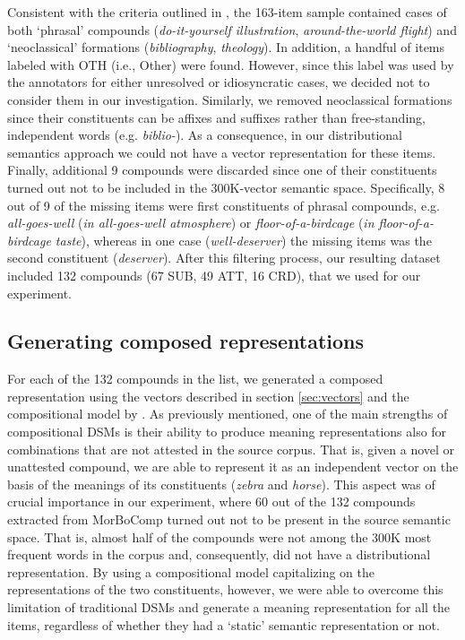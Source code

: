 \documentclass[output=paper]{langsci/langscibook}
\begin{document}
Consistent with the criteria outlined in \cite{SB2005}, the 163-item sample contained cases of both `phrasal' compounds (\emph{do-it-yourself illustration}, \emph{around-the-world flight}) and `neoclassical' formations (\emph{bibliography}, \emph{theology}). In addition, a handful of items labeled with OTH (i.e., Other) were found. However, since this label was used by the annotators for either unresolved or idiosyncratic cases, we decided not to consider them in our investigation. Similarly, we removed neoclassical formations since their constituents can be affixes and suffixes rather than free-standing, independent words (e.g. \emph{biblio-}). As a consequence, in our distributional semantics approach we could not have a vector representation for these items. Finally, additional 9 compounds were discarded since one of their constituents turned out not to be included in the 300K-vector semantic space. Specifically, 8 out of 9 of the missing items were first constituents of phrasal compounds, e.g. \emph{all-goes-well} (\emph{in all-goes-well atmosphere}) or \emph{floor-of-a-birdcage} (\emph{in floor-of-a-birdcage taste}), whereas in one case (\emph{well-deserver}) the missing items was the second constituent (\emph{deserver}). After this filtering process, our resulting dataset included 132 compounds (67 SUB, 49 ATT, 16 CRD), that we used for our experiment.


\subsection{Generating composed representations}


For each of the 132 compounds in the list, we generated a composed representation using the vectors described in section \ref{sec:vectors} and the compositional model by \cite{guevara2010}. As previously mentioned, one of the main strengths of compositional DSMs is their ability to produce meaning representations also for combinations that are not attested in the source corpus. That is, given a novel or unattested compound, we are able to represent it as an independent vector on the basis of the meanings of its constituents (\emph{zebra} and \emph{horse}). This aspect was of crucial importance in our experiment, where 60 out of the 132 compounds extracted from MorBoComp turned out not to be present in the source semantic space. That is, almost half of the compounds were not among the 300K most frequent words in the corpus and, consequently, did not have a distributional representation. By using a compositional model capitalizing on the representations of the two constituents, however, we were able to overcome this limitation of traditional DSMs and generate a meaning representation for all the items, regardless of whether they had a `static' semantic representation or not.
\end{document}
